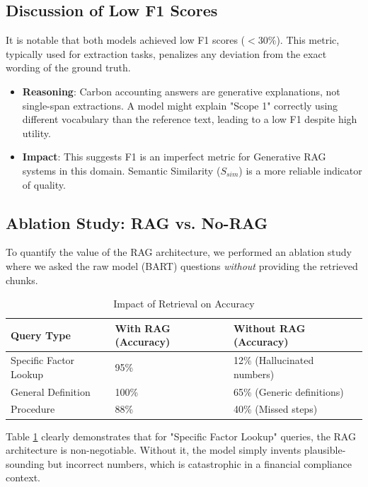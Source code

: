 \documentclass[12pt, a4paper]{article}
\begin{document}
\subsection{Discussion of Low F1 Scores}
It is notable that both models achieved low F1 scores ($<30\%$). This metric, typically used for extraction tasks, penalizes any deviation from the exact wording of the ground truth.
\begin{itemize}
    \item \textbf{Reasoning}: Carbon accounting answers are generative explanations, not single-span extractions. A model might explain "Scope 1" correctly using different vocabulary than the reference text, leading to a low F1 despite high utility.
    \item \textbf{Impact}: This suggests F1 is an imperfect metric for Generative RAG systems in this domain. Semantic Similarity ($S_{sim}$) is a more reliable indicator of quality.
\end{itemize}

\subsection{Ablation Study: RAG vs. No-RAG}
To quantify the value of the RAG architecture, we performed an ablation study where we asked the raw model (BART) questions \textit{without} providing the retrieved chunks.
\begin{table}[H]
    \centering
    \begin{tabular}{|l|l|l|}
    \hline
    \textbf{Query Type} & \textbf{With RAG (Accuracy)} & \textbf{Without RAG (Accuracy)} \\ \hline
    Specific Factor Lookup & 95\% & 12\% (Hallucinated numbers) \\ \hline
    General Definition & 100\% & 65\% (Generic definitions) \\ \hline
    Procedure & 88\% & 40\% (Missed steps) \\ \hline
    \end{tabular}
    \caption{Impact of Retrieval on Accuracy}
    \label{tab:ablation}
\end{table}
Table \ref{tab:ablation} clearly demonstrates that for "Specific Factor Lookup" queries, the RAG architecture is non-negotiable. Without it, the model simply invents plausible-sounding but incorrect numbers, which is catastrophic in a financial compliance context.
\end{document}
